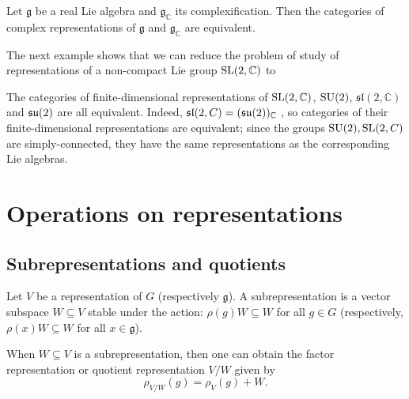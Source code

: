 \documentclass{report}
\begin{document}
\begin{lemma}
    Let $\mathfrak g $ be a real Lie algebra and $\mathfrak g_{\mathbb C}$ its complexification.
    Then the categories of complex representations of $\mathfrak g$ and $\mathfrak g_{\mathbb C}$ are equivalent.
\end{lemma}
The next example shows that we can reduce the problem of study of representations of a non-compact Lie group $\operatorname{{\mathrm{SL}}}(2, \mathbb C)$ to 
\begin{example}
    The categories of ﬁnite-dimensional representations of $\operatorname{{\mathrm{SL}}}(2, \mathbb C)$,
$\operatorname{{\mathrm{SU}}}(2)$, $\mathfrak{sl}(2, \mathbb C)$ and $\operatorname{{\mathfrak{su}}}(2)$ are all equivalent. Indeed,
$\mathfrak{sl}(2, C) = (\operatorname{{\mathfrak{su}}}(2))_{\mathbb C}$ , so categories of their ﬁnite-dimensional representations are equivalent; since the groups $\operatorname{{\mathrm{SU}}}(2), \operatorname{{\mathrm{SL}}}(2, C)$ are simply-connected, they
have the same representations as the corresponding Lie algebras.
\end{example}

\section{Operations on representations}
\subsection{Subrepresentations and quotients}

\begin{definition}
    Let $V$ be a representation of $G$ (respectively $\mathfrak g$). 
    A subrepresentation is a vector subspace $W \subseteq V$ stable under the action:
    $\rho(g)W \subseteq W$ for all $g \in G$ (respectively, $\rho(x)W \subseteq W$ for all $x \in \mathfrak g$).
\end{definition}

When $W \subseteq V$ is a subrepresentation, then one can obtain the factor representation or quotient representation $V/W$ given by
\[
\rho_{V/W}(g) = \rho_V(g) + W.
\]
\end{document}
